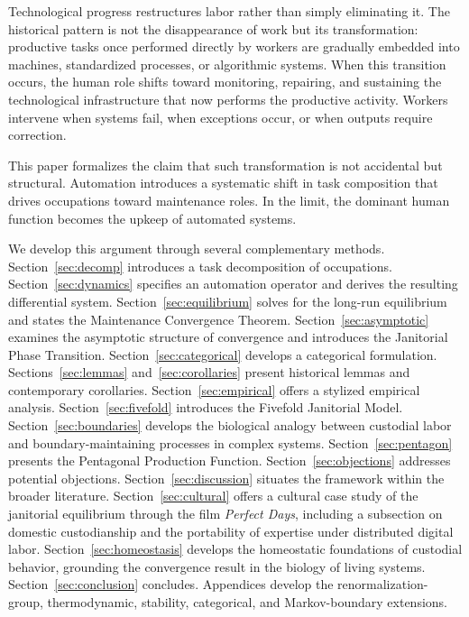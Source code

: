 \documentclass[12pt,a4paper]{article}
\theoremstyle{plain}
\theoremstyle{definition}
\theoremstyle{remark}
\begin{document}
Technological progress restructures labor rather than simply eliminating it.
The historical pattern is not the disappearance of work but its
transformation: productive tasks once performed directly by workers are
gradually embedded into machines, standardized processes, or algorithmic
systems.  When this transition occurs, the human role shifts toward
monitoring, repairing, and sustaining the technological infrastructure that
now performs the productive activity.  Workers intervene when systems fail,
when exceptions occur, or when outputs require correction.

This paper formalizes the claim that such transformation is not accidental
but structural.  Automation introduces a systematic shift in task composition
that drives occupations toward maintenance roles.  In the limit, the dominant
human function becomes the upkeep of automated systems.

We develop this argument through several complementary methods.
Section~\ref{sec:decomp} introduces a task decomposition of occupations.
Section~\ref{sec:dynamics} specifies an automation operator and derives the
resulting differential system.  Section~\ref{sec:equilibrium} solves for the
long-run equilibrium and states the Maintenance Convergence Theorem.
Section~\ref{sec:asymptotic} examines the asymptotic structure of convergence
and introduces the Janitorial Phase Transition.  Section~\ref{sec:categorical}
develops a categorical formulation.  Sections~\ref{sec:lemmas}
and~\ref{sec:corollaries} present historical lemmas and contemporary
corollaries.  Section~\ref{sec:empirical} offers a stylized empirical
analysis.  Section~\ref{sec:fivefold} introduces the Fivefold Janitorial
Model.  Section~\ref{sec:boundaries} develops the biological analogy between
custodial labor and boundary-maintaining processes in complex systems.
Section~\ref{sec:pentagon} presents the Pentagonal Production Function.
Section~\ref{sec:objections} addresses potential objections.
Section~\ref{sec:discussion} situates the framework within the broader
literature.  Section~\ref{sec:cultural} offers a cultural case study of the
janitorial equilibrium through the film \emph{Perfect Days}, including
a subsection on domestic custodianship and the portability of expertise
under distributed digital labor.  Section~\ref{sec:homeostasis} develops
the homeostatic foundations of custodial behavior, grounding the convergence
result in the biology of living systems.  Section~\ref{sec:conclusion}
concludes.  Appendices develop the renormalization-group, thermodynamic,
stability, categorical, and Markov-boundary extensions.
\end{document}
